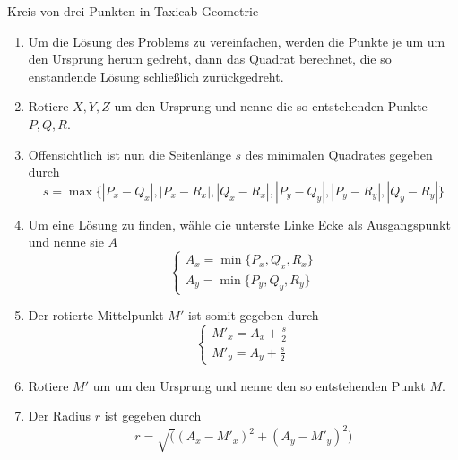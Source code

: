 \documentclass{article}
\begin{document}
\begin{algorithm}[H]
    \caption{Kreis von drei Punkten in Taxicab-Geometrie}
    \BlankLine
    \begin{enumerate}
    \item Um die Lösung des Problems zu vereinfachen, werden die Punkte je um \unit[45]{\textdegree} um den
    Ursprung herum gedreht, dann das Quadrat berechnet, die so enstandende Lösung schließlich zurückgedreht.
    \item Rotiere $X, Y, Z$ \unit[45]{\textdegree} um den Ursprung und nenne die so entstehenden Punkte $P, Q, R$.
    \item Offensichtlich ist nun die Seitenlänge $s$ des minimalen Quadrates gegeben durch
    \begin{equation}
    s = \max\{|P_x-Q_x|,|P_x-R_x|,|Q_x-R_x|,|P_y-Q_y|,|P_y-R_y|,|Q_y-R_y|\}
    \end{equation}
    \item Um eine Lösung zu finden, wähle die unterste Linke Ecke als Ausgangspunkt und nenne sie $A$
    \begin{equation}
    \begin{cases}
    A_x = \min\{P_x,Q_x,R_x\}\\
    A_y = \min\{P_y,Q_y,R_y\}
    \end{cases}
    \end{equation}
    \item Der rotierte Mittelpunkt $M'$ ist somit gegeben durch
    \begin{equation}
    \begin{cases}
    M'_x = A_x + \frac{s}{2}\\
    M'_y = A_y + \frac{s}{2}
    \end{cases}
    \end{equation}
    \item Rotiere $M'$ um \unit[45]{\textdegree} um den Ursprung und nenne den so entstehenden Punkt $M$.
    \item Der Radius $r$ ist gegeben durch 
    \begin{equation}
    r = \sqrt( (A_x - M'_x) ^ 2 + (A_y - M'_y) ^ 2 )     
    \end{equation}
    \end{enumerate}
\end{algorithm}
\end{document}
